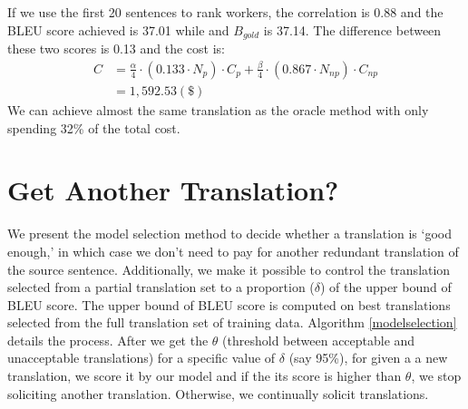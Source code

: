 \documentclass[11pt,letterpaper]{article}
\begin{document}
If we use the first 20 sentences to rank workers, the correlation is 0.88 and  the BLEU score achieved is 37.01 while  and $B_{gold}$ is 37.14. The difference between these two scores is 0.13 and the cost is: \\
  \begin{align*}
  C& = \frac{\alpha}{4} \cdot  (0.133 \cdot N_{p}) \cdot C_{p}  + \frac{\beta }{4}\cdot (0.867\cdot N_{np} ) \cdot C_{np}\\
   & = 1,592.53 (\$)
  \end{align*}  
We can achieve almost the same translation as the oracle method with only spending 32\% of the total cost. 
\section{Get Another Translation?}
We present the model selection method to decide whether a translation  is `good enough,' in which case we don't need to  pay for another redundant translation of the source sentence. Additionally, we make it possible to control the translation selected from a partial translation set to a proportion ($\delta$) of the upper bound of BLEU score. The upper bound of BLEU score is computed on best translations selected from  the full translation set of training data. Algorithm \ref{modelselection} details the process. After we get the $\theta$ (threshold between acceptable and unacceptable translations) for a specific value of $\delta$ (say 95\%), for given a a new translation, we score it by our model and if the its score is higher than $\theta$, we stop soliciting another translation. Otherwise, we continually solicit translations.  
\end{document}
